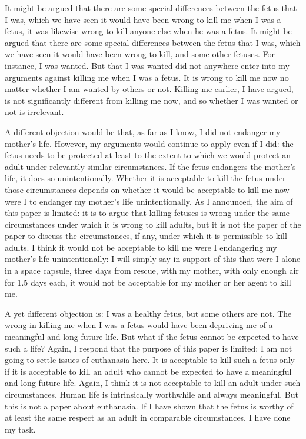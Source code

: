 It might be argued that there are some special differences between 
the fetus that I was, which we have seen it would have been wrong to 
  kill  me  when  I was a fetus, it was 
likewise wrong to kill anyone else when he was a fetus.  
It might be argued that there are some special differences between 
the fetus that I was, which we have seen it would have been wrong to 
kill, and some other fetuses.  For instance, I was wanted.  But that I was 
wanted  did  not  anywhere  enter  into  my  arguments  against  killing  me 
when I was a fetus.  It is wrong to kill me now no matter whether I am 
wanted  by  others  or  not.    Killing  me  earlier,  I  have  argued,  is  not 
significantly different from killing me now, and so whether I was wanted 
or not is irrelevant. 

A  different  objection  would  be  that,  as  far  as  I  know,  I  did  not 
endanger my mother’s life.  However, my arguments would continue to 
apply even if I did: the fetus needs to be protected at least to the extent to 
which we would protect an adult under relevantly similar circumstances.  
If  the  fetus  endangers  the  mother’s  life,  it  does  so    unintentionally.  
Whether  it  is  acceptable  to  kill  the  fetus  under  those  circumstances 
depends  on  whether  it  would  be  acceptable  to  kill  me  now  were  I  to 
endanger my mother’s life unintentionally. As I announced, the aim of 
this paper is limited: it is to argue that killing fetuses is wrong under the 
same circumstances under which it is wrong to kill adults, but it is not the 
paper of the paper to discuss the circumstances, if any, under which it is 
permissible to kill adults.  I think it would not be acceptable to kill me 
were I endangering my mother’s life unintentionally: I will simply say in 
support  of  this  that  were  I  alone  in  a  space  capsule,  three  days  from 
rescue, with my mother, with only enough air for 1.5 days each, it would 
not be acceptable for my mother or her agent to kill me. 

A yet different objection is: I was a healthy fetus, but some others 
are not.  The wrong in killing me when I was a fetus would have been 
depriving me of a meaningful and long future life.  But what if the fetus 
cannot be expected to have such a life?  Again, I respond that the purpose 
of this paper is limited: I am not going to settle issues of euthanasia here. 
 It is acceptable to kill such a fetus only if it is acceptable to kill an adult 
 who  cannot  be  expected  to  have  a  meaningful  and  long  future  life.  
Again, I think it is not acceptable to kill an adult under such 
circumstances.    Human  life  is  intrinsically  worthwhile  and  always 
meaningful.  But this is not a paper about euthanasia.  If I have shown 
that  the  fetus  is  worthy  of  at  least  the  same  respect  as  an  adult  in 
comparable circumstances, I have done my task.